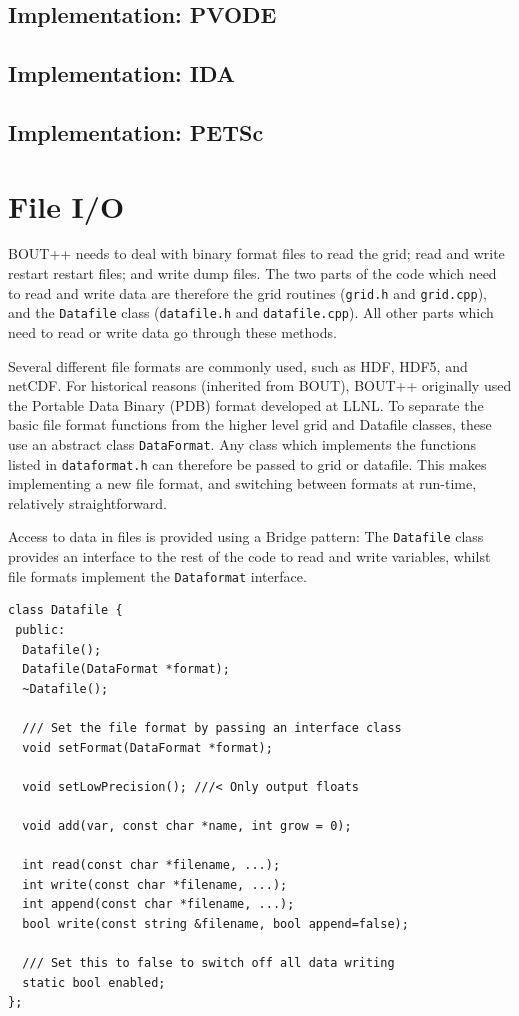 \documentclass[12pt]{article}
\newcommand{\code}[1]{\texttt{#1}}
\begin{document}
\subsection{Implementation: PVODE}


\subsection{Implementation: IDA}

\subsection{Implementation: PETSc}

\section{File I/O}

BOUT++ needs to deal with binary format files to read the grid;
read and write restart restart files; and write dump files. 
The two parts of the code which need to read and write data are therefore
the grid routines (\code{grid.h} and \code{grid.cpp}), and the
\code{Datafile} class (\code{datafile.h} and \code{datafile.cpp}).
All other parts which need to read or write data go through these
methods.

Several different file formats are commonly used, such as HDF, HDF5, and netCDF. 
For historical reasons (inherited from BOUT), BOUT++ originally used the
Portable Data Binary (PDB) format developed at LLNL. 
To separate the basic file format functions from the higher level grid and 
Datafile classes, these use an abstract class \code{DataFormat}. Any
class which implements the functions listed in \code{dataformat.h}
can therefore be passed to grid or datafile. This makes implementing
a new file format, and switching between formats at run-time, 
relatively straightforward.


Access to data in files is provided using a Bridge pattern: The
\code{Datafile} class provides an interface to the rest of the code
to read and write variables, whilst file formats implement the
\code{Dataformat} interface.
\begin{lstlisting}
class Datafile {
 public:
  Datafile();
  Datafile(DataFormat *format);
  ~Datafile();
  
  /// Set the file format by passing an interface class
  void setFormat(DataFormat *format);

  void setLowPrecision(); ///< Only output floats

  void add(var, const char *name, int grow = 0);

  int read(const char *filename, ...);
  int write(const char *filename, ...);
  int append(const char *filename, ...);
  bool write(const string &filename, bool append=false);

  /// Set this to false to switch off all data writing
  static bool enabled;
};
\end{lstlisting}
\end{document}
